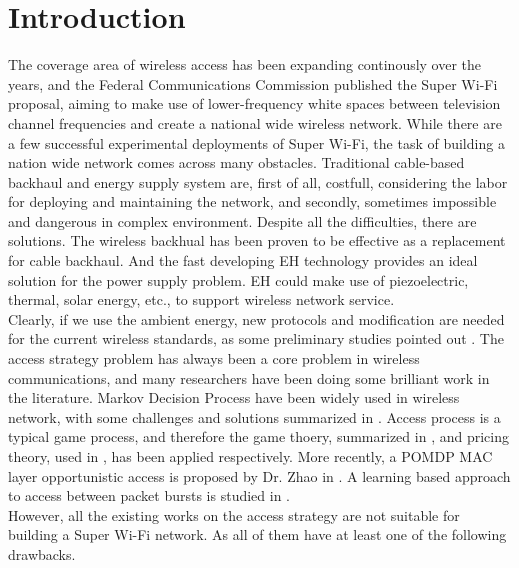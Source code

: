 \documentclass[conference]{IEEEtran}
\begin{document}
\section{Introduction}
The coverage area of wireless access has been expanding continously over the years,
and the Federal Communications Commission published the Super Wi-Fi proposal,
aiming to make use of lower-frequency white spaces between television channel frequencies
and create a national wide wireless network.
While there are a few successful experimental deployments of Super Wi-Fi,
the task of building a nation wide network comes across many obstacles.
Traditional cable-based backhaul and energy supply system are, first of all,
costfull, considering the labor for deploying and maintaining the network,
and secondly, sometimes impossible and dangerous in complex environment.
Despite all the difficulties, there are solutions.
The wireless backhual has been proven to be effective \cite{30} as a replacement for cable backhaul.
And the fast developing EH technology provides an ideal solution for the power supply problem.
EH could make use of piezoelectric, thermal, solar energy, etc., to support wireless network service.\\
\indent Clearly, if we use the ambient energy,
new protocols and modification are needed for the current wireless standards,
as some preliminary studies pointed out \cite{27}.
The access strategy problem has always been a core problem in wireless communications,
and many researchers have been doing some brilliant work in the literature.
Markov Decision Process have been widely used in wireless network,
with some challenges and solutions summarized in \cite{23}.
Access process is a typical game process,
and therefore the game thoery, summarized in \cite{22},
and pricing theory, used in \cite{7}, has been applied respectively.
More recently, a POMDP MAC layer opportunistic access is proposed by Dr. Zhao in \cite{zhao1}.
A learning based approach to access between packet bursts is studied in \cite{kae1}.
\\
\indent However, all the existing works on the access strategy are not suitable for 
building a Super Wi-Fi network.
As all of them have at least one of the following drawbacks.
\end{document}
